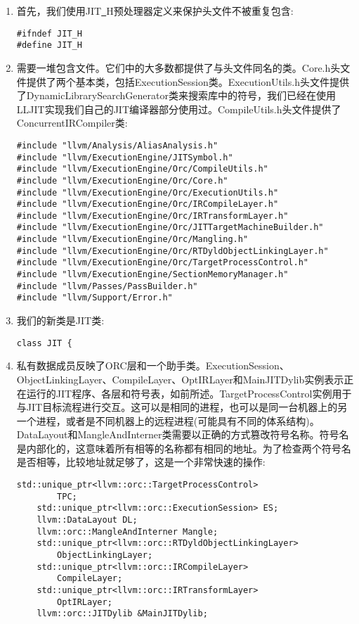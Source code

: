 \begin{enumerate}
\item 首先，我们使用JIT\underline{~}H预处理器定义来保护头文件不被重复包含:
\begin{lstlisting}[caption={}]
#ifndef JIT_H
#define JIT_H
\end{lstlisting}

\item 需要一堆包含文件。它们中的大多数都提供了与头文件同名的类。Core.h头文件提供了两个基本类，包括ExecutionSession类。ExecutionUtils.h头文件提供了DynamicLibrarySearchGenerator类来搜索库中的符号，我们已经在使用LLJIT实现我们自己的JIT编译器部分使用过。CompileUtils.h头文件提供了ConcurrentIRCompiler类:
\begin{lstlisting}[caption={}]
#include "llvm/Analysis/AliasAnalysis.h"
#include "llvm/ExecutionEngine/JITSymbol.h"
#include "llvm/ExecutionEngine/Orc/CompileUtils.h"
#include "llvm/ExecutionEngine/Orc/Core.h"
#include "llvm/ExecutionEngine/Orc/ExecutionUtils.h"
#include "llvm/ExecutionEngine/Orc/IRCompileLayer.h"
#include "llvm/ExecutionEngine/Orc/IRTransformLayer.h"
#include "llvm/ExecutionEngine/Orc/JITTargetMachineBuilder.h"
#include "llvm/ExecutionEngine/Orc/Mangling.h"
#include "llvm/ExecutionEngine/Orc/RTDyldObjectLinkingLayer.h"
#include "llvm/ExecutionEngine/Orc/TargetProcessControl.h"
#include "llvm/ExecutionEngine/SectionMemoryManager.h"
#include "llvm/Passes/PassBuilder.h"
#include "llvm/Support/Error.h"
\end{lstlisting}

\item 我们的新类是JIT类:
\begin{lstlisting}[caption={}]
class JIT {
\end{lstlisting}

\item 私有数据成员反映了ORC层和一个助手类。ExecutionSession、ObjectLinkingLayer、CompileLayer、OptIRLayer和MainJITDylib实例表示正在运行的JIT程序、各层和符号表，如前所述。TargetProcessControl实例用于与JIT目标流程进行交互。这可以是相同的进程，也可以是同一台机器上的另一个进程，或者是不同机器上的远程进程(可能具有不同的体系结构)。DataLayout和MangleAndInterner类需要以正确的方式篡改符号名称。符号名是内部化的，这意味着所有相等的名称都有相同的地址。为了检查两个符号名是否相等，比较地址就足够了，这是一个非常快速的操作:
\begin{lstlisting}[caption={}]
	std::unique_ptr<llvm::orc::TargetProcessControl> 
		TPC;
	std::unique_ptr<llvm::orc::ExecutionSession> ES;
	llvm::DataLayout DL;
	llvm::orc::MangleAndInterner Mangle;
	std::unique_ptr<llvm::orc::RTDyldObjectLinkingLayer>
		ObjectLinkingLayer;
	std::unique_ptr<llvm::orc::IRCompileLayer>
		CompileLayer;
	std::unique_ptr<llvm::orc::IRTransformLayer>
		OptIRLayer;
	llvm::orc::JITDylib &MainJITDylib;
\end{lstlisting}


\end{enumerate}
